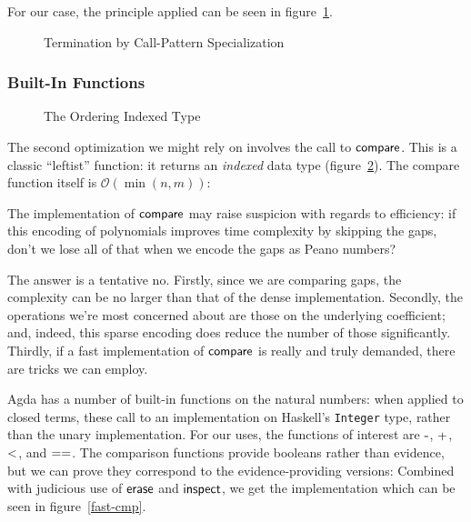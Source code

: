 \documentclass[draft, twocolumn]{article}
\theoremstyle{definition}
\theoremstyle{definition}
\begin{document}
For our case, the principle applied can be seen in figure~\ref{term-add}.

\begin{figure}
  \centering
  \caption{Termination by Call-Pattern Specialization}
  \label{term-add}
\end{figure}

\subsubsection{Built-In Functions}
\begin{figure}
  \caption{The Ordering Indexed Type}
  \label{ord-type}
\end{figure}
The second optimization we might rely on involves the call to
\(\AgdaFunction{compare}\). This is a classic ``leftist'' function: it returns
an \emph{indexed} data type (figure~\ref{ord-type}). The compare function itself
is \(\mathcal{O}(\min(n, m))\):


The implementation of \(\AgdaFunction{compare}\) may raise suspicion with
regards to efficiency: if this encoding of polynomials improves time complexity
by skipping the gaps, don't we lose all of that when we encode the gaps as Peano
numbers?

The answer is a tentative no. Firstly, since we are comparing gaps, the
complexity can be no larger than that of the dense implementation. Secondly, the
operations we're most concerned about are those on the underlying coefficient;
and, indeed, this sparse encoding does reduce the number of those significantly.
Thirdly, if a fast implementation of \(\AgdaFunction{compare}\) is really and
truly demanded, there are tricks we can employ.

Agda has a number of built-in functions on the natural numbers: when applied to
closed terms, these call to an implementation on Haskell's \texttt{Integer}
type, rather than the unary implementation. For our uses, the functions of
interest are \(\AgdaFunction{-}\), \(\AgdaFunction{+}\), \(\AgdaFunction{<}\),
and \(\AgdaFunction{==}\). The comparison functions provide booleans rather than
evidence, but we can prove they correspond to the evidence-providing versions:
Combined with judicious use of \(\AgdaFunction{erase}\) and
\(\AgdaFunction{inspect}\), we get the implementation which can be seen in
figure~\ref{fast-cmp}.
\end{document}
